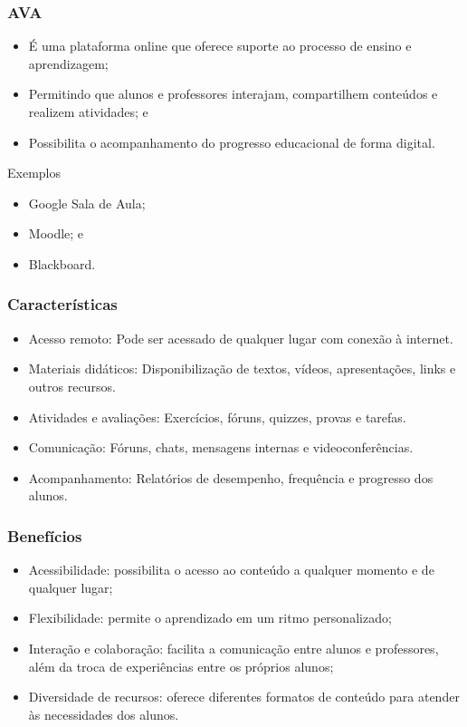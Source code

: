 \documentclass[aspectratio=169]{beamer} %
\begin{document}
\begin{frame}
	\frametitle{AVA}
	
	\begin{itemize}
		\item É uma plataforma online que oferece suporte ao processo de ensino e aprendizagem;
		\item Permitindo que alunos e professores interajam, compartilhem conteúdos e realizem atividades; e
		\item Possibilita o acompanhamento do progresso educacional de forma digital.
	\end{itemize} \vfill
	
	\begin{exampleblock}{Exemplos}
		\begin{itemize}
			\item Google Sala de Aula;
			\item Moodle; e
			\item Blackboard.
		\end{itemize}
	\end{exampleblock}
\end{frame}

\begin{frame}
	\frametitle{Características}
	
	\begin{itemize}
		\item Acesso remoto: Pode ser acessado de qualquer lugar com conexão à internet.
		\item Materiais didáticos: Disponibilização de textos, vídeos, apresentações, links e outros recursos.
		\item Atividades e avaliações: Exercícios, fóruns, quizzes, provas e tarefas.
		\item Comunicação: Fóruns, chats, mensagens internas e videoconferências.
		\item Acompanhamento: Relatórios de desempenho, frequência e progresso dos alunos.
	\end{itemize}
\end{frame}

\begin{frame}
	\frametitle{Benefícios}
	
	\begin{itemize}
		\item Acessibilidade: possibilita o acesso ao conteúdo a qualquer momento e de qualquer lugar;
		\item Flexibilidade: permite o aprendizado em um ritmo personalizado;
		\item Interação e colaboração: facilita a comunicação entre alunos e professores, além da troca de experiências entre os próprios alunos;
		\item Diversidade de recursos: oferece diferentes formatos de conteúdo para atender às necessidades dos alunos.
	\end{itemize}
\end{frame}
\end{document}
